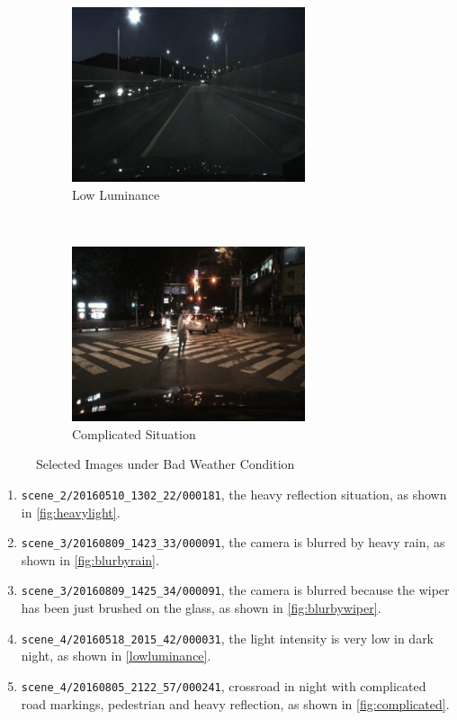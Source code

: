 \begin{spacing}{1.5}
\begin{figure}[!ht]
    ~
    \begin{subfigure}[b]{0.49\textwidth}
        \centering
        \includegraphics[width=2.7in, fbox]{Chapter5/scene_4-20160518_2015_42-000031.png}
        \caption{Low Luminance}
        \label{lowluminance}
    \end{subfigure}
    \\
    \begin{subfigure}[b]{0.98\textwidth}
        \centering
        \includegraphics[width=2.7in, fbox]{Chapter5/scene_4-20160805_2122_57-000241.png}
        \caption{Complicated Situation}
        \label{fig:complicated}
    \end{subfigure}%
    \caption{Selected Images under Bad Weather Condition}
    \label{fig:rainyimg}
\end{figure}

\begin{enumerate}
    \item \texttt{scene\_2/20160510\_1302\_22/000181}, the heavy reflection situation, as shown in \autoref{fig:heavylight}.
    \item \texttt{scene\_3/20160809\_1423\_33/000091}, the camera is blurred by heavy rain, as shown in \autoref{fig:blurbyrain}.
    \item \texttt{scene\_3/20160809\_1425\_34/000091}, the camera is blurred because the wiper has been just brushed on the glass, as shown in \autoref{fig:blurbywiper}.
    \item \texttt{scene\_4/20160518\_2015\_42/000031}, the light intensity is very low in dark night, as shown in \autoref{lowluminance}.
    \item \texttt{scene\_4/20160805\_2122\_57/000241}, crossroad in night with complicated road markings, pedestrian and heavy reflection, as shown in \autoref{fig:complicated}.
\end{enumerate}


\end{spacing}
